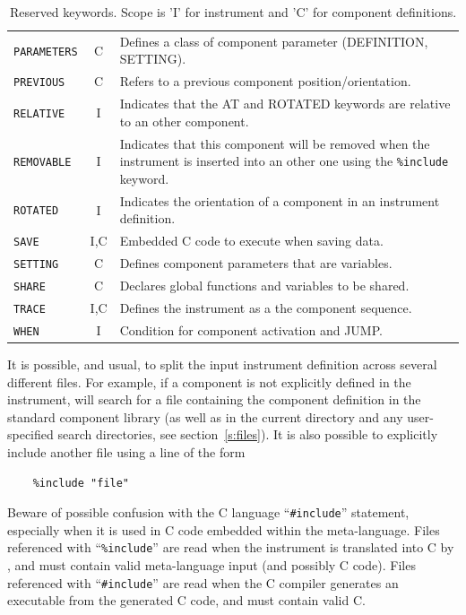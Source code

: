 \begin{table}
\begin{center}
{\begin{tabular}{|l|c|p{}|}
      \texttt{PARAMETERS} & C & Defines a class of component parameter (DEFINITION, SETTING). \\
      \texttt{PREVIOUS} & C & Refers to a previous component position/orientation.\\
      \texttt{RELATIVE} & I & Indicates that the AT and ROTATED keywords are relative to an other component. \\
      \texttt{REMOVABLE} & I & Indicates that this component will be removed when the instrument is inserted into an other one using the \texttt{\%include} keyword. \\
      \texttt{ROTATED} & I & Indicates the orientation of a component in an instrument definition. \\
      \texttt{SAVE} & I,C & Embedded C code to execute when saving data. \\
      \texttt{SETTING} & C & Defines component parameters that are
      variables. \\
      \texttt{SHARE} & C & Declares global functions and variables to be shared. \\
      \texttt{TRACE} & I,C & Defines the instrument as a the component sequence. \\
      \texttt{WHEN}  & I & Condition for component activation and JUMP.\\
      \hline
    \end{tabular}
    \caption{Reserved \MCS keywords.
    Scope is 'I' for instrument and 'C' for component definitions.
    }
    \label{t:keywords}
    }
  \end{center}
\end{table}

It is possible, and usual, to split the input instrument definition
across several different files. For example, if a component is not
explicitly defined in the instrument,
\mcs will search for a file containing the component definition in the
standard component library (as well as in the current directory and any
user-specified search directories, see section~\ref{s:files}). It is
also possible to explicitly include another file using a line of the
form 
\begin{lstlisting}
    %include "file"
\end{lstlisting}
Beware of possible confusion with the C language ``\verb+#include+''
statement, especially when it is used in C code embedded within the
\MCS meta-language. Files referenced with ``\verb+%include+'' are read
when the instrument is translated into C by \mcs, and must
contain valid \MCS meta-language input (and possibly C code). Files referenced with
``\verb+#include+'' are read when the C compiler generates an
executable from the generated C code, and must contain valid C.


